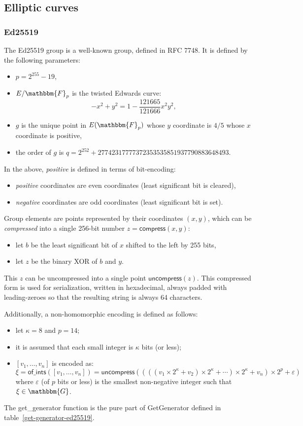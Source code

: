 \documentclass[a4paper]{article}
\newcommand{\F}{\mathbbm{F}}
\newcommand{\G}{\mathbbm{G}}
\begin{document}
\subsection{Elliptic curves}

\subsubsection{Ed25519}

The Ed25519 group is a well-known group, defined in RFC 7748. It is
defined by the following parameters:
\begin{itemize}
\item $p=2^{255}-19$,
\item $E/\F_p$ is the twisted Edwards curve:
  \[
    -x^2+y^2=1-\frac{121665}{121666}x^2y^2,
  \]
\item $g$ is the unique point in $E(\F_p)$ whose $y$ coordinate is
  $4/5$ whose $x$ coordinate is positive,
\item the order of $g$ is $q=2^{252}+27742317777372353535851937790883648493$.
\end{itemize}
In the above, \emph{positive} is defined in terms of bit-encoding:
\begin{itemize}
\item \emph{positive} coordinates are even coordinates (least significant bit is cleared),
\item \emph{negative} coordinates are odd coordinates (least significant bit is set).
\end{itemize}

Group elements are points represented by their coordinates $(x, y)$,
which can be \emph{compressed} into a single 256-bit number
$z=\textsf{compress}(x,y)$:
\begin{itemize}
\item let $b$ be the least significant bit of $x$ shifted to the left
  by 255 bits,
\item let $z$ be the binary XOR of $b$ and $y$.
\end{itemize}
This $z$ can be uncompressed into a single point
$\textsf{uncompress}(z)$. This compressed form is used for
serialization, written in hexadecimal, always padded with
leading-zeroes so that the resulting string is always 64 characters.

Additionally, a non-homomorphic encoding is defined as follows:
\begin{itemize}
\item let $\kappa=8$ and $p=14$;
\item it is assumed that each small integer is $\kappa$ bits (or less);
\item $[v_1,\dots,v_n]$ is encoded as:
  \[
    \xi=\textsf{of\_ints}([v_1,\dots,v_n])=\textsf{uncompress}((((v_1\times
    2^\kappa+v_2)\times 2^\kappa+\dotsb)\times 2^\kappa+v_n)\times
    2^p+\varepsilon)
  \]
  where $\varepsilon$ (of $p$ bits or less) is the smallest
  non-negative integer such that $\xi\in\G$.
\end{itemize}
The \textsf{get\_generator} function is the pure part of
\textsf{GetGenerator} defined in table~\ref{get-generator-ed25519}.
\end{document}
